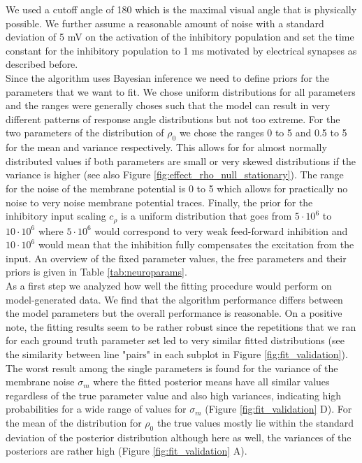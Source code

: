     We used a cutoff angle of 180\textdegree{} which is the maximal visual angle that is physically possible.
    We further assume a reasonable amount of noise with a standard deviation of 5 mV on the activation of the inhibitory population and set the time constant for the inhibitory population to 1 ms motivated by electrical synapses as described before.\\
    Since the algorithm uses Bayesian inference we need to define priors for the parameters that we want to fit.
    We chose uniform distributions for all parameters and the ranges were generally choses such that the model can result in very different patterns of response angle distributions but not too extreme.
    For the two parameters of the distribution of $\rho_0$ we chose the ranges 0 to 5 and 0.5 to 5 for the mean and variance respectively.
    This allows for for almost normally distributed values if both parameters are small or very skewed distributions if the variance is higher (see also Figure \ref{fig:effect_rho_null_stationary}).
    The range for the noise of the membrane potential is 0 to 5 which allows for practically no noise to very noise membrane potential traces.
    Finally, the prior for the inhibitory input scaling $c_{\rho}$ is a uniform distribution that goes from $5\cdot 10^{6}$ to $10\cdot 10^{6}$ where $5\cdot 10^{6}$ would correspond to very weak feed-forward inhibition and $10\cdot 10^6$ would mean that the inhibition fully compensates the excitation from the input.
    An overview of the fixed parameter values, the free parameters and their priors is given in Table \ref{tab:neuroparams}.\\
    As a first step we analyzed how well the fitting procedure would perform on model-generated data.
    We find that the algorithm performance differs between the model parameters but the overall performance is reasonable.
    On a positive note, the fitting results seem to be rather robust since the repetitions that we ran for each ground truth parameter set led to very similar fitted distributions (see the similarity between line "pairs" in each subplot in Figure \ref{fig:fit_validation}).
    The worst result among the single parameters is found for the variance of the membrane noise $\sigma_m$ where the fitted posterior means have all similar values regardless of the true parameter value and also high variances, indicating high probabilities for a wide range of values for $\sigma_m$ (Figure \ref{fig:fit_validation} D).
    For the mean of the distribution for $\rho_{0}$ the true values mostly lie within the standard deviation of the posterior distribution although here as well, the variances of the posteriors are rather high (Figure \ref{fig:fit_validation} A).
